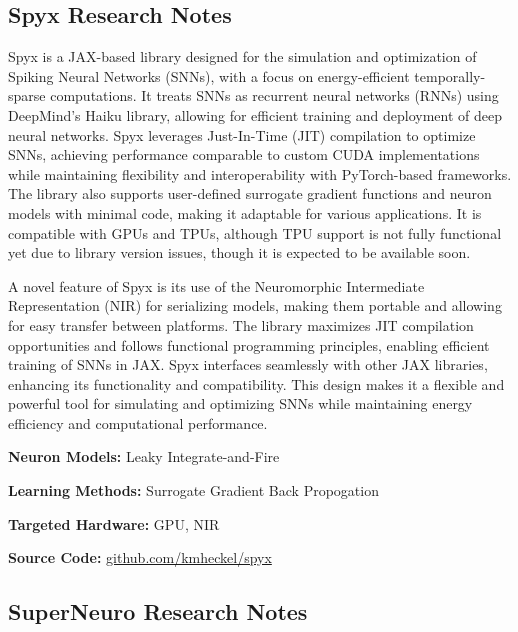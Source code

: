 \subsection*{Spyx Research Notes}\label{Spyx}

Spyx is a JAX-based library designed for the simulation and optimization of Spiking Neural Networks (SNNs), with a focus on energy-efficient temporally-sparse computations. It treats SNNs as recurrent neural networks (RNNs) using DeepMind’s Haiku library, allowing for efficient training and deployment of deep neural networks. Spyx leverages Just-In-Time (JIT) compilation to optimize SNNs, achieving performance comparable to custom CUDA implementations while maintaining flexibility and interoperability with PyTorch-based frameworks. The library also supports user-defined surrogate gradient functions and neuron models with minimal code, making it adaptable for various applications. It is compatible with GPUs and TPUs, although TPU support is not fully functional yet due to library version issues, though it is expected to be available soon.

A novel feature of Spyx is its use of the Neuromorphic Intermediate Representation (NIR) for serializing models, making them portable and allowing for easy transfer between platforms. The library maximizes JIT compilation opportunities and follows functional programming principles, enabling efficient training of SNNs in JAX. Spyx interfaces seamlessly with other JAX libraries, enhancing its functionality and compatibility. This design makes it a flexible and powerful tool for simulating and optimizing SNNs while maintaining energy efficiency and computational performance.

\begin{tcolorbox}[enhanced,attach boxed title to top center={yshift=-3mm,yshifttext=-1mm}, colback=blue!5!white,colframe=blue!75!black,colbacktitle=red!80!black, title=Spyx at a Glance,fonttitle=\bfseries, boxed title style={size=small,colframe=red!50!black} ]

\textbf{Neuron Models:} Leaky Integrate-and-Fire

\textbf{Learning Methods:} Surrogate Gradient Back Propogation  

\textbf{Targeted Hardware:} GPU, NIR 

\textbf{Source Code:} \href{https://github.com/kmheckel/spyx}{github.com/kmheckel/spyx}
\end{tcolorbox}
\subsection*{SuperNeuro Research Notes}\label{SuperNeuro}

